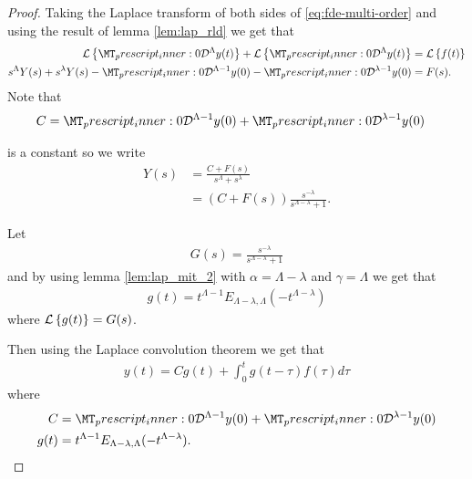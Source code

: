 \begin{proof}

	Taking the Laplace transform of both sides of \ref{eq:fde-multi-order} and using the result of lemma \ref{lem:lap_rld}
	we get that 
	\begin{align}
		\laplace{\prescript{}{0}{\mathcal{D}}^{\Lambda}y(t)} + \laplace{\prescript{}{0}{\mathcal{D}}^{\Lambda}y(t)} &= \laplace{f(t)} \\
		s^\Lambda Y(s) + s^\lambda Y(s) - \prescript{}{0}{\mathcal{D}}^{\Lambda-1}y(0) - \prescript{}{0}{\mathcal{D}}^{\lambda-1}y(0) &= F(s).
	\end{align}
	Note that 
	\begin{align}
	    C &= \prescript{}{0}{\mathcal{D}}^{\Lambda-1}y(0) + \prescript{}{0}{\mathcal{D}}^{\lambda-1}y(0) 
	\end{align}
	 
	is a constant so we write
	\begin{align}
		Y(s) &= \frac{C + F(s)}{s^\Lambda + s^\lambda} \\
			&= \left( C + F(s)\right) \frac{s^{-\lambda}}{s^{\Lambda-\lambda} + 1}.
	\end{align}
	
	Let 
	\begin{align} 
	    G(s) = \frac{s^{-\lambda}}{s^{\Lambda-\lambda} + 1} 
	\end{align}
	and by using lemma \ref{lem:lap_mit_2} with $ \alpha = \Lambda - \lambda $ and $ \gamma = \Lambda $
	we get that 
	\begin{align}
	    g(t) = t^{\Lambda  -1}E_{\Lambda - \lambda, \Lambda}(-t^{\Lambda - \lambda})
	\end{align} where $ \mathcal{L} \left\{ g(t) \right\} = G(s) $.
	
	Then using the Laplace convolution theorem we get that 
	\begin{align}
		y(t) = C g(t) + \int_0^t g(t-\tau)f(\tau) d\tau
	\end{align}
	where
	\begin{align}
		C &= \prescript{}{0}{\mathcal{D}}^{\Lambda-1}y(0) + \prescript{}{0}{\mathcal{D}}^{\lambda-1}y(0)  \\
		g(t) &= t^{\Lambda - 1} E_{\Lambda - \lambda, \Lambda}(-t^{\Lambda - \lambda}).
	\end{align}
\end{proof}

